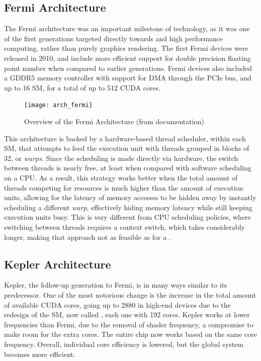 \documentclass[main.tex]{subfiles}
\begin{document}
\subsection{Fermi Architecture}

The Fermi architecture was an important milestone of \gpus technology, as it was one of the first generations targeted directly towards \gpgpu and high performance computing, rather than purely graphics rendering. The first Fermi devices were released in 2010, and include more efficient support for double precision floating point number when compared to earlier generations. Fermi devices also included a GDDR5 memory controller with support for \ac{DMA} through the \acs{PCIe} bus, and up to 16 \acf{SM}, for a total of up to 512 \acs{CUDA} cores.

\begin{figure}[!htp]
  \centering
  \texttt{[image: arch\_fermi]}
  \caption[Overview of the Fermi Architecture]{Overview of the Fermi Architecture (from \nvidia documentation)}
  \label{fig:fermi}
\end{figure}

This architecture is backed by a hardware-based thread scheduler, within each \acs{SM}, that attempts to feed the execution unit with threads grouped in blocks of 32, or \textit{warps}. Since the scheduling is made directly via hardware, the switch between threads is nearly free, at least when compared with software scheduling on a \acs{CPU}. As a result, this strategy works better when the total amount of threads competing for resources is much higher than the amount of execution units, allowing for the latency of memory accesses to be hidden away by instantly scheduling a different \textit{warp}, effectively hiding memory latency while still keeping execution units busy. This is very different from \acs{CPU} scheduling policies, where switching between threads requires a context switch, which takes considerably longer, making that approach not as feasible as for a \gpu.


\subsection{Kepler Architecture}

Kepler, the follow-up generation to Fermi, is in many ways similar to its predecessor. One of the most notorious change is the increase in the total amount of available CUDA cores, going up to 2880 in high-end devices due to the redesign of the \acl{SM}, now called \smx, each one with 192 \cuda cores. Kepler works at lower frequencies than Fermi, due to the removal of shader frequency, a compromise to make room for the extra \cuda cores. The entire chip now works based on the same core frequency. Overall, individual core efficiency is lowered, but the global system becomes more efficient.
\end{document}
